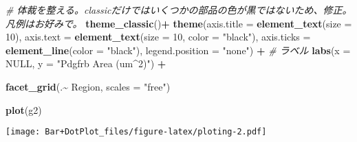 \documentclass[
  a4paper,
  number-of-lines=30,
  textwidth=40zw]{bxjsarticle}
\newenvironment{Shaded}{\begin{snugshade}}{\end{snugshade}}
\newcommand{\AttributeTok}[1]{\textcolor[rgb]{0.13,0.29,0.53}{#1}}
\newcommand{\CommentTok}[1]{\textcolor[rgb]{0.56,0.35,0.01}{\textit{#1}}}
\newcommand{\ConstantTok}[1]{\textcolor[rgb]{0.56,0.35,0.01}{#1}}
\newcommand{\DecValTok}[1]{\textcolor[rgb]{0.00,0.00,0.81}{#1}}
\newcommand{\FunctionTok}[1]{\textcolor[rgb]{0.13,0.29,0.53}{\textbf{#1}}}
\newcommand{\NormalTok}[1]{#1}
\newcommand{\SpecialCharTok}[1]{\textcolor[rgb]{0.81,0.36,0.00}{\textbf{#1}}}
\newcommand{\StringTok}[1]{\textcolor[rgb]{0.31,0.60,0.02}{#1}}
\begin{document}
\begin{Shaded}
\begin{Highlighting}[]
  \CommentTok{\# 体裁を整える。classicだけではいくつかの部品の色が黒ではないため、修正。凡例はお好みで。}
  \FunctionTok{theme\_classic}\NormalTok{()}\SpecialCharTok{+} 
  \FunctionTok{theme}\NormalTok{(}\AttributeTok{axis.title =} \FunctionTok{element\_text}\NormalTok{(}\AttributeTok{size =} \DecValTok{10}\NormalTok{),}
        \AttributeTok{axis.text =} \FunctionTok{element\_text}\NormalTok{(}\AttributeTok{size =} \DecValTok{10}\NormalTok{, }\AttributeTok{color =} \StringTok{"black"}\NormalTok{),}
        \AttributeTok{axis.ticks =} \FunctionTok{element\_line}\NormalTok{(}\AttributeTok{color =} \StringTok{"black"}\NormalTok{),}
        \AttributeTok{legend.position =} \StringTok{"none"}\NormalTok{) }\SpecialCharTok{+}
  \CommentTok{\# ラベル}
  \FunctionTok{labs}\NormalTok{(}\AttributeTok{x =} \ConstantTok{NULL}\NormalTok{, }\AttributeTok{y =} \StringTok{"Pdgfrb Area (um\^{}2)"}\NormalTok{) }\SpecialCharTok{+} 
  
  \FunctionTok{facet\_grid}\NormalTok{(.}\SpecialCharTok{\textasciitilde{}}\NormalTok{ Region, }\AttributeTok{scales =} \StringTok{"free"}\NormalTok{)}

  \FunctionTok{plot}\NormalTok{(g2)}
\end{Highlighting}
\end{Shaded}

\texttt{[image: Bar+DotPlot\_files/figure-latex/ploting-2.pdf]}
\end{document}
